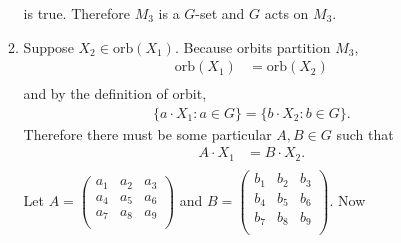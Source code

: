 \documentclass[10pt]{article}
\begin{document}
\begin{enumerate}
\begin{enumerate}
        is true.
        Therefore $M_3$ is a $G$-set and $G$ acts on $M_3$.
      \item Suppose $X_2 \in \text{orb}(X_1)$. Because orbits partition $M_3$,
        \begin{align*}
          \text{orb}(X_1) &= \text{orb}(X_2) \\
        \end{align*}
        and by the definition of orbit,
        \begin{align*}
          \{ a \cdot X_1 : a \in G \} = \{ b \cdot X_2 : b \in G \}.
        \end{align*}
        Therefore there must be some particular $A, B \in G$ such that
        \begin{align*}
          A \cdot X_1 &= B \cdot X_2. \\
        \end{align*}
        Let $A = \begin{pmatrix} a_1 & a_2 & a_3 \\ a_4 & a_5 & a_6 \\ a_7 & a_8 & a_9 \\ \end{pmatrix}$
        and $B = \begin{pmatrix} b_1 & b_2 & b_3 \\ b_4 & b_5 & b_6 \\ b_7 & b_8 & b_9 \\ \end{pmatrix}$. Now


\end{enumerate}
\end{enumerate}
\end{document}
